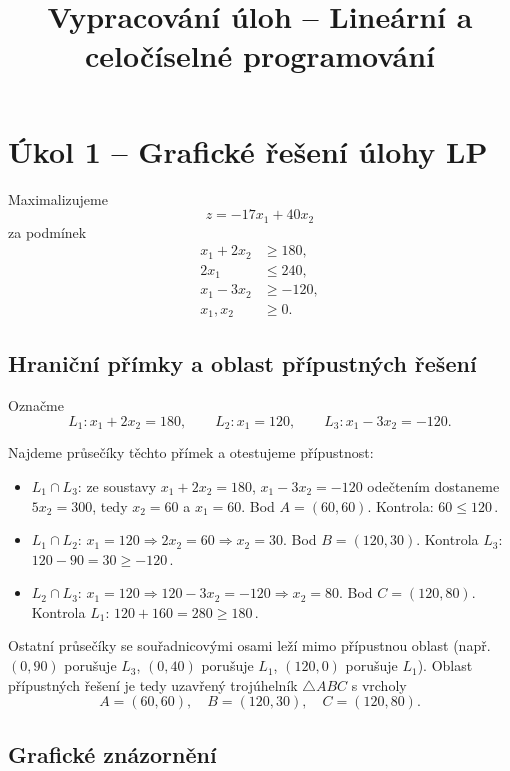 \documentclass[11pt,a4paper]{article}
\title{Vypracování úloh -- Lineární a celočíselné programování}
\author{}
\date{}
\begin{document}
	\maketitle
	
	\section*{Úkol 1 -- Grafické řešení úlohy LP}
	
	Maximalizujeme
	\[
	z = -17x_1 + 40x_2
	\]
	za podmínek
	\[
	\begin{aligned}
		x_1 + 2x_2 &\geq 180, \\
		2x_1 &\leq 240, \\
		x_1 - 3x_2 &\geq -120, \\
		x_1, x_2 &\geq 0.
	\end{aligned}
	\]
	
	\subsection*{Hraniční přímky a oblast přípustných řešení}
	
	Označme
	\[
	L_1: x_1 + 2x_2 = 180, \qquad
	L_2: x_1 = 120, \qquad
	L_3: x_1 - 3x_2 = -120.
	\]
	
	Najdeme průsečíky těchto přímek a otestujeme přípustnost:
	\begin{itemize}[leftmargin=*]
		\item $L_1 \cap L_3$: ze soustavy $x_1+2x_2=180$, $x_1-3x_2=-120$ odečtením dostaneme $5x_2=300$, tedy $x_2=60$ a $x_1=60$. Bod $A=(60,60)$. Kontrola: $60\le 120$\,\checkmark.
		\item $L_1 \cap L_2$: $x_1=120 \Rightarrow 2x_2=60 \Rightarrow x_2=30$. Bod $B=(120,30)$. Kontrola $L_3$: $120-90=30\geq -120$\,\checkmark.
		\item $L_2 \cap L_3$: $x_1=120 \Rightarrow 120-3x_2=-120 \Rightarrow x_2=80$. Bod $C=(120,80)$. Kontrola $L_1$: $120+160=280\geq 180$\,\checkmark.
	\end{itemize}
	
	Ostatní průsečíky se souřadnicovými osami leží mimo přípustnou oblast (např. $(0,90)$ porušuje $L_3$, $(0,40)$ porušuje $L_1$, $(120,0)$ porušuje $L_1$). Oblast přípustných řešení je tedy uzavřený trojúhelník $\triangle ABC$ s vrcholy
	\[
	A=(60,60),\quad B=(120,30),\quad C=(120,80).
	\]
	
	\subsection*{Grafické znázornění}
	
\end{document}
